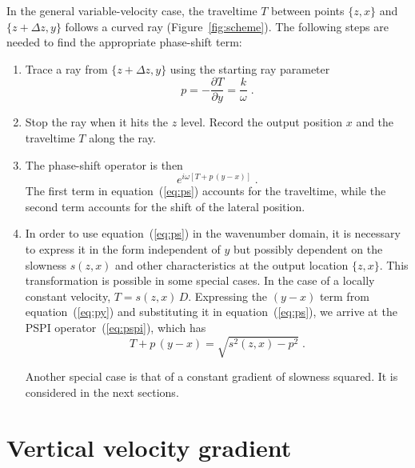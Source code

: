 In the general variable-velocity case, the traveltime $T$ between points
$\{z,x\}$ and $\{z+\Delta z,y\}$ follows a curved ray
(Figure~\ref{fig:scheme}). The following steps are needed to find the
appropriate phase-shift term:
\begin{enumerate}
\item Trace a ray from $\{z+\Delta z,y\}$ using the starting ray parameter 
  \begin{equation}
    \label{eq:py}
    p = -\frac{\partial T}{\partial y} = \frac{k}{\omega}\;.
  \end{equation}
\item Stop the ray when it hits the $z$ level. Record the output
  position $x$ and the traveltime  $T$ along the ray.
\item The phase-shift operator is then
  \begin{equation}
    \label{eq:ps}
    e^{i\omega\left[T + p\,(y-x)\right]}\;.
    \end{equation}
    The first term in equation~(\ref{eq:ps}) accounts for the traveltime,
    while the second term accounts for the shift of the lateral position.
  \item In order to use equation~(\ref{eq:ps}) in the wavenumber domain, it is
    necessary to express it in the form independent of $y$ but possibly
    dependent on the slowness $s(z,x)$ and other characteristics at the output
    location $\{z,x\}$. This transformation is possible in some special cases.
    In the case of a locally constant velocity, $T = s(z,x)\,D$. Expressing
    the $(y-x)$ term from equation~(\ref{eq:py}) and substituting it in
    equation~(\ref{eq:ps}), we arrive at the PSPI operator~(\ref{eq:pspi}),
    which has
    \begin{equation}
      \label{eq:simp}
      T+p\,(y-x) = \sqrt{s^2(z,x)-p^2}\;.
    \end{equation}

    Another special case is that of a constant
    gradient of slowness squared. It is considered in the next sections.
\end{enumerate}

\section{Vertical velocity gradient}

